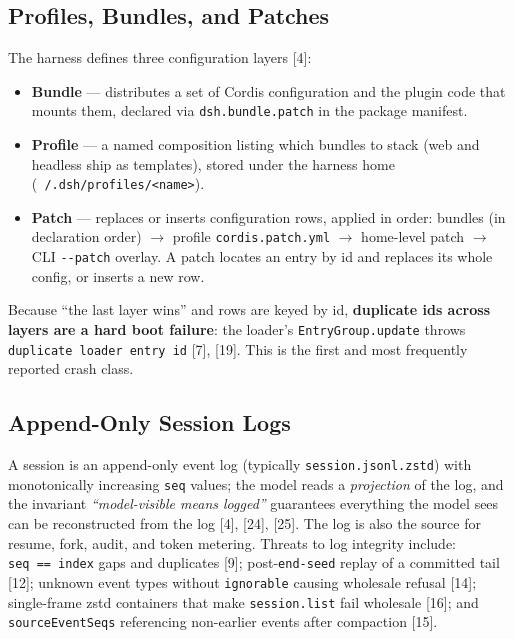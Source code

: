 \documentclass[11pt]{article}
\providecommand{\tightlist}{%
  \setlength{\itemsep}{0pt}\setlength{\parskip}{0pt}}
\begin{document}
\subsection{Profiles, Bundles, and
Patches}\label{profiles-bundles-and-patches}

The harness defines three configuration layers [4]:

\begin{itemize}
\tightlist
\item
  \textbf{Bundle} --- distributes a set of Cordis configuration and the
  plugin code that mounts them, declared via \texttt{dsh.bundle.patch}
  in the package manifest.
\item
  \textbf{Profile} --- a named composition listing which bundles to
  stack (web and headless ship as templates), stored under the harness
  home
  (\texttt{~/.dsh/profiles/\textless{}name\textgreater{}}).
\item
  \textbf{Patch} --- replaces or inserts configuration rows, applied in
  order: bundles (in declaration order)  $\to$  profile
  \texttt{cordis.patch.yml}  $\to$  home-level patch  $\to$  CLI \texttt{-\/-patch}
  overlay. A patch locates an entry by id and replaces its whole config,
  or inserts a new row.
\end{itemize}

Because ``the last layer wins'' and rows are keyed by id,
\textbf{duplicate ids across layers are a hard boot failure}: the
loader's \texttt{EntryGroup.update} throws
\texttt{duplicate\ loader\ entry\ id} [7], [19]. This is the
first and most frequently reported crash class.

\subsection{Append-Only Session
Logs}\label{append-only-session-logs}

A session is an append-only event log (typically
\texttt{session.jsonl.zstd}) with monotonically increasing \texttt{seq}
values; the model reads a \emph{projection} of the log, and the
invariant \emph{``model-visible means logged''} guarantees everything
the model sees can be reconstructed from the log [4], [24],
[25]. The log is also the source for resume, fork, audit, and token
metering. Threats to log integrity include: \texttt{seq\ ==\ index} gaps
and duplicates [9]; post-\texttt{end-seed} replay of a committed
tail [12]; unknown event types without \texttt{ignorable} causing
wholesale refusal [14]; single-frame zstd containers that make
\texttt{session.list} fail wholesale [16]; and
\texttt{sourceEventSeqs} referencing non-earlier events after compaction
[15].
\end{document}
